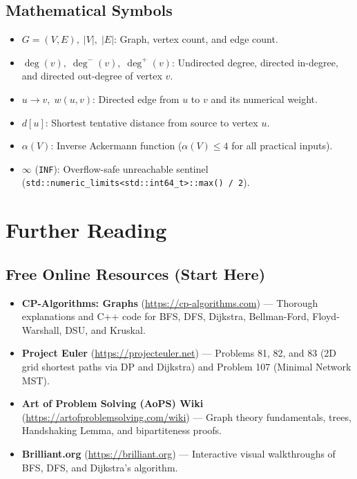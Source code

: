 \documentclass[11pt,a4paper]{article}
\theoremstyle{definition}
\begin{document}
\subsection*{Mathematical Symbols}
\begin{itemize}
    \item $G = (V, E),\; |V|,\; |E|$: Graph, vertex count, and edge count.
    \item $\deg(v),\; \deg^-(v),\; \deg^+(v)$: Undirected degree, directed in-degree, and directed out-degree of vertex $v$.
    \item $u \to v,\; w(u, v)$: Directed edge from $u$ to $v$ and its numerical weight.
    \item $d[u]$: Shortest tentative distance from source to vertex $u$.
    \item $\alpha(V)$: Inverse Ackermann function ($\alpha(V) \le 4$ for all practical inputs).
    \item $\infty$ (\texttt{INF}): Overflow-safe unreachable sentinel (\texttt{std::numeric\_limits<std::int64\_t>::max() / 2}).
\end{itemize}

\section{Further Reading}

\subsection*{Free Online Resources (Start Here)}
\begin{itemize}
    \item \textbf{CP-Algorithms: Graphs} (\url{https://cp-algorithms.com}) --- Thorough explanations and C++ code for BFS, DFS, Dijkstra, Bellman-Ford, Floyd-Warshall, DSU, and Kruskal.
    \item \textbf{Project Euler} (\url{https://projecteuler.net}) --- Problems 81, 82, and 83 (2D grid shortest paths via DP and Dijkstra) and Problem 107 (Minimal Network MST).
    \item \textbf{Art of Problem Solving (AoPS) Wiki} (\url{https://artofproblemsolving.com/wiki}) --- Graph theory fundamentals, trees, Handshaking Lemma, and bipartiteness proofs.
    \item \textbf{Brilliant.org} (\url{https://brilliant.org}) --- Interactive visual walkthroughs of BFS, DFS, and Dijkstra's algorithm.
\end{itemize}
\end{document}
